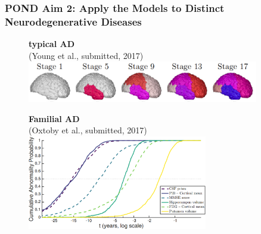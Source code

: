 \documentclass[8pt,xcolor=table]{beamer}
\begin{document}
\begin{frame}
\frametitle{POND Aim 2: Apply the Models to Distinct Neurodegenerative Diseases}

\newcommand{\mnpHeight}{3cm}

\vspace{-3em}
  
  
  \hspace{-2em}
  \begin{small}
  \begin{figure}[h]
  \centering
  
      \begin{minipage}[t][\mnpHeight][t]{0.49\linewidth}
    \centering
    \textbf{typical AD}\\ \footnotesize{(Young et al., submitted, 2017)}
    \includegraphics[width=0.9\textwidth]{../young_progression.png}
  \end{minipage}
  \begin{minipage}[t][\mnpHeight][t]{0.49\linewidth}
    \centering
    \textbf{Familial AD}\\ \footnotesize{(Oxtoby et al., submitted, 2017)}
    \includegraphics[width=0.7\textwidth,trim=0 0 0 0, clip]{../neil_dian.png}
    
    \vspace{2em}
    
  \end{minipage}
  \vspace{2em}
  

\end{figure}
\end{small}
\end{frame}
\end{document}
